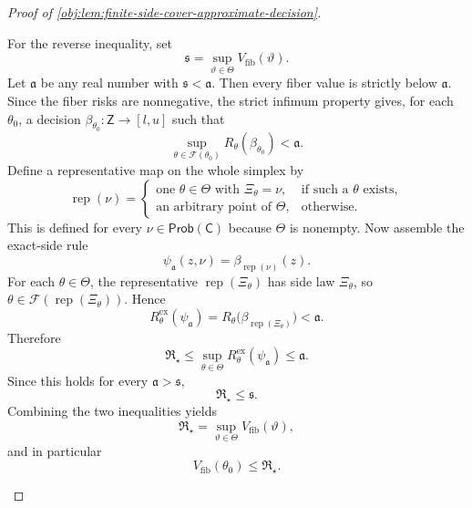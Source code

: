 \begin{proof}[Proof of \cref{obj:lem:finite-side-cover-approximate-decision}]
\begin{enumerate}
For the reverse inequality, set
\[
\mathfrak s=\sup_{\vartheta\in\Theta}V_{\mathrm{fib}}(\vartheta).
\]
Let \(\mathfrak a\) be any real number with \(\mathfrak s<\mathfrak a\). Then every fiber value is strictly below \(\mathfrak a\). Since the fiber risks are nonnegative, the strict infimum property gives, for each \(\theta_0\), a decision \(\beta_{\theta_0}:\mathsf Z\to[l,u]\) such that
\[
\sup_{\theta\in\mathcal F(\theta_0)}R_\theta(\beta_{\theta_0})<\mathfrak a.
\]
Define a representative map on the whole simplex by
\[
\operatorname{rep}(\nu)=
\begin{cases}
\text{one }\theta\in\Theta\text{ with }\Xi_\theta=\nu, & \text{if such a }\theta\text{ exists},\\
\text{an arbitrary point of }\Theta, & \text{otherwise}.
\end{cases}
\]
This is defined for every \(\nu\in\mathsf{Prob}(\mathsf C)\) because \(\Theta\) is nonempty. Now assemble the exact-side rule
\[
\psi_{\mathfrak a}(z,\nu)=\beta_{\operatorname{rep}(\nu)}(z).
\]
For each \(\theta\in\Theta\), the representative \(\operatorname{rep}(\Xi_\theta)\) has side law \(\Xi_\theta\), so \(\theta\in\mathcal F(\operatorname{rep}(\Xi_\theta))\). Hence
\[
R^{\mathrm{ex}}_\theta(\psi_{\mathfrak a})
=
R_\theta\bigl(\beta_{\operatorname{rep}(\Xi_\theta)}\bigr)
<\mathfrak a.
\]
Therefore
\[
\mathfrak R_\star
\le
\sup_{\theta\in\Theta}R^{\mathrm{ex}}_\theta(\psi_{\mathfrak a})
\le \mathfrak a.
\]
Since this holds for every \(\mathfrak a>\mathfrak s\),
\[
\mathfrak R_\star\le\mathfrak s.
\]
Combining the two inequalities yields
\[
\mathfrak R_\star=\sup_{\vartheta\in\Theta}V_{\mathrm{fib}}(\vartheta),
\]
and in particular
\[
V_{\mathrm{fib}}(\theta_0)\le \mathfrak R_\star .
\]


\end{enumerate}
\end{proof}
